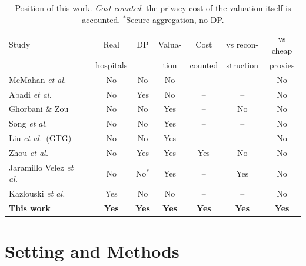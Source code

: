 \documentclass[journal]{IEEEtran}
\begin{document}
\begin{table}[t]
\caption{Position of this work. \emph{Cost counted}: the privacy cost of the valuation itself is accounted. $^{\ast}$Secure aggregation, no DP.}
\centering\scriptsize
\setlength{\tabcolsep}{3pt}
\begin{tabular}{lcccccc}
\toprule
Study & Real & DP & Valua- & Cost & vs recon- & vs cheap \\
 & hospitals & & tion & counted & struction & proxies \\
\midrule
McMahan \emph{et al.}\ \cite{McMahan2017FedAvg} & No & No & No & -- & -- & No \\
Abadi \emph{et al.}\ \cite{Abadi2016DPSGD} & No & Yes & No & -- & -- & No \\
Ghorbani \& Zou \cite{Ghorbani2019DataShapley} & No & No & Yes & -- & No & No \\
Song \emph{et al.}\ \cite{Song2019BlockchainFL} & No & No & Yes & -- & -- & No \\
Liu \emph{et al.}\ (GTG) \cite{Liu2022GTG} & No & No & Yes & -- & -- & No \\
Zhou \emph{et al.}\ \cite{Zhou2025Data} & No & Yes & Yes & Yes & No & No \\
Jaramillo Velez \emph{et al.}\ \cite{JaramilloVelez2026Beyond} & No & No$^{\ast}$ & Yes & -- & Yes & No \\
Kazlouski \emph{et al.}\ \cite{Kazlouski2025HospitalParticipation} & Yes & No & No & -- & -- & No \\
\textbf{This work} & \textbf{Yes} & \textbf{Yes} & \textbf{Yes} & \textbf{Yes} & \textbf{Yes} & \textbf{Yes} \\
\bottomrule
\end{tabular}
\label{tab:lit_comparison}
\end{table}

\section{Setting and Methods}
\label{sec:method}
\label{sec:system}
\end{document}

